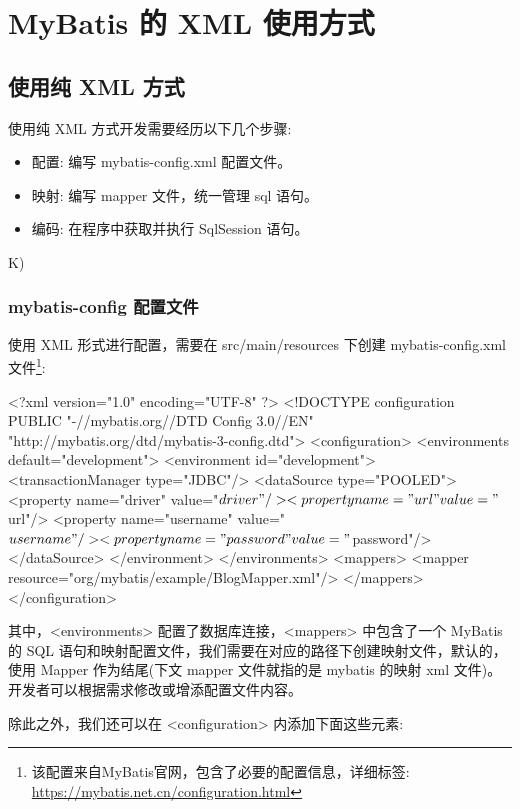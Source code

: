 \section{MyBatis 的 XML 使用方式}

\subsection{使用纯 XML 方式}

使用纯 XML 方式开发需要经历以下几个步骤:
\begin{itemize}
    \item 配置: 编写 mybatis-config.xml 配置文件。
    \item 映射: 编写 mapper 文件，统一管理 sql 语句。
    \item 编码: 在程序中获取并执行 SqlSession 语句。
\end{itemize}
K)
\subsubsection{mybatis-config 配置文件}

使用 XML 形式进行配置，需要在 src/main/resources 下创建 mybatis-config.xml 文件\footnote{该配置来自MyBatis官网，包含了必要的配置信息，详细标签: \url{https://mybatis.net.cn/configuration.html}}:

\begin{xml}
<?xml version="1.0" encoding="UTF-8" ?>
<!DOCTYPE configuration
        PUBLIC "-//mybatis.org//DTD Config 3.0//EN"
        "http://mybatis.org/dtd/mybatis-3-config.dtd">
<configuration>
    <environments default="development">
        <environment id="development">
            <transactionManager type="JDBC"/>
            <dataSource type="POOLED">
                <property name="driver" value="${driver}"/>
                <property name="url" value="${url}"/>
                <property name="username" value="${username}"/>
                <property name="password" value="${password}"/>
            </dataSource>
        </environment>
    </environments>
    <mappers>
        <mapper resource="org/mybatis/example/BlogMapper.xml"/>
    </mappers>
</configuration>
\end{xml}

其中，<environments> 配置了数据库连接，<mappers> 中包含了一个 MyBatis 的 SQL 语句和映射配置文件，我们需要在对应的路径下创建映射文件，默认的，使用 Mapper 作为结尾(下文 mapper 文件就指的是 mybatis 的映射 xml 文件)。开发者可以根据需求修改或增添配置文件内容。

除此之外，我们还可以在 <configuration> 内添加下面这些元素:

